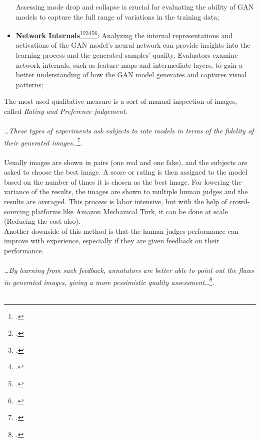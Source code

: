 \begin{itemize}
    Assessing mode drop and collapse is crucial for evaluating the ability of GAN models to capture the full range of variations in the training data;
    \item \textbf{Network Internals}\footcite{paper:netint}\footcite{paper:netint1}\footcite{paper:netint2}\footcite{paper:netint3}\footcite{paper:netint4}\footcite{paper:netint5}: 
    Analyzing the internal representations and activations of the GAN model's neural network can provide insights into the learning process and the generated samples' quality. 
    Evaluators examine network internals, such as feature maps and intermediate layers, to gain a better understanding of how the GAN model generates and captures visual patterns;
\end{itemize}
The most used qualitative measure is a sort of manual inspection of images, called \emph{Rating and Preference judgement}.\\\\
\emph{\dots These types of experiments ask subjects to rate models in terms of the fidelity of their generated images\dots}\footcite{paper:ganeval}.\\\\
Usually images are shown in pairs (one real and one fake), and the subjects are asked to choose the best image.
A score or rating is then assigned to the model based on the number of times it is chosen as the best image.
For lowering the variance of the results, the images are shown to multiple human judges and the results are averaged.
This process is labor intensive, but with the help of crowd-sourcing platforms like Amazon Mechanical Turk, 
it can be done at scale (Reducing the cost also).\\
Another downside of this method is that the human judges performance can improve with experience, especially if they are given feedback on their performance.\\\\
\emph{\dots By learning from such feedback, annotators are better able to point out the flaws in generated images, giving a more pessimistic quality assessment\dots}\footcite{paper:ganeval}.\\\\
